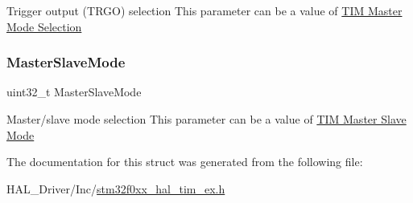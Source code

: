 Trigger output (T\+R\+GO) selection This parameter can be a value of \hyperlink{group___t_i_m___master___mode___selection}{T\+IM Master Mode Selection} \mbox{\label{struct_t_i_m___master_config_type_def_aa17903ecbee15ce7a6d51de5e9602d3f}} 
\subsubsection{\texorpdfstring{Master\+Slave\+Mode}{MasterSlaveMode}}
{\footnotesize\ttfamily uint32\+\_\+t Master\+Slave\+Mode}

Master/slave mode selection This parameter can be a value of \hyperlink{group___t_i_m___master___slave___mode}{T\+IM Master Slave Mode} 

The documentation for this struct was generated from the following file\+:\begin{DoxyCompactItemize}
\item 
H\+A\+L\+\_\+\+Driver/\+Inc/\hyperlink{stm32f0xx__hal__tim__ex_8h}{stm32f0xx\+\_\+hal\+\_\+tim\+\_\+ex.\+h}\end{DoxyCompactItemize}
